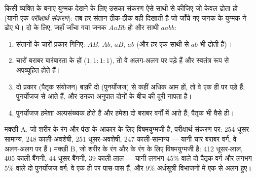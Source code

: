 \begin{method}[परीक्षार्थ संकरण]\label{met:g12:meiosis-genetic-shuffling:testcross}
किसी व्यक्ति के बनाए युग्मक देखने के लिए उसका संकरण ऐसे साथी से कीजिए जो
केवल   ढोता हो (यानी एक \emph{परीक्षार्थ संकरण}): तब हर
संतान ठीक-ठीक वही  दिखाती है जो जाँचे गए जनक के युग्मक ने ढोए
थे। दो  के लिए, जहाँ जाँचा गया जनक $AaBb$ हो और साथी $aabb$:
\begin{enumerate}
  \item संतानों के चारों प्रकार गिनिए: $AB$, $Ab$, $aB$, $ab$ (और हर एक
        साथी से $ab$ भी ढोती है)।
  \item चारों बराबर बारंबारता के हों ($1:1:1:1$), तो वे  अलग-अलग
         पर पड़े हैं और स्वतंत्र रूप से अपव्यूहित होते हैं।
  \item दो प्रकार (पैतृक संयोजन) बाक़ी दो (पुनर्योजज) से कहीं अधिक आम हों,
        तो वे  एक ही  पर पड़े हैं; पुनर्योजज  से आते
        हैं, और उनका अनुपात दोनों  के बीच की दूरी नापता है।
  \item पुनर्योजज हमेशा अल्पसंख्यक होते हैं और हमेशा दो बराबर वर्गों में
        आते हैं; पैतृक भी वैसे ही।
\end{enumerate}
\end{method}

\begin{example}[फल-मक्खी में दो संकरण]\label{ex:g12:meiosis-genetic-shuffling:fly}
मक्खी A, जो शरीर के रंग और पंख के आकार के लिए विषमयुग्मजी है, परीक्षार्थ
संकरण पर: 254 धूसर-सामान्य, 248 काली-अवशेषी, 251 धूसर-अवशेषी, 247
काली-सामान्य --- यानी चार बराबर वर्ग, वे  अलग-अलग  पर हैं।
मक्खी B, जो शरीर के रंग और  के रंग के लिए विषमयुग्मजी है: 412 धूसर-लाल,
405 काली-बैंगनी, 44 धूसर-बैंगनी, 39 काली-लाल --- यानी लगभग 45\% वाले दो
पैतृक वर्ग और लगभग 5\% वाले दो पुनर्योजज वर्ग: वे  एक ही  पर
पास-पास हैं, और 9\% अर्धसूत्री विभाजनों में एक  से अलग हुए।
\end{example}

